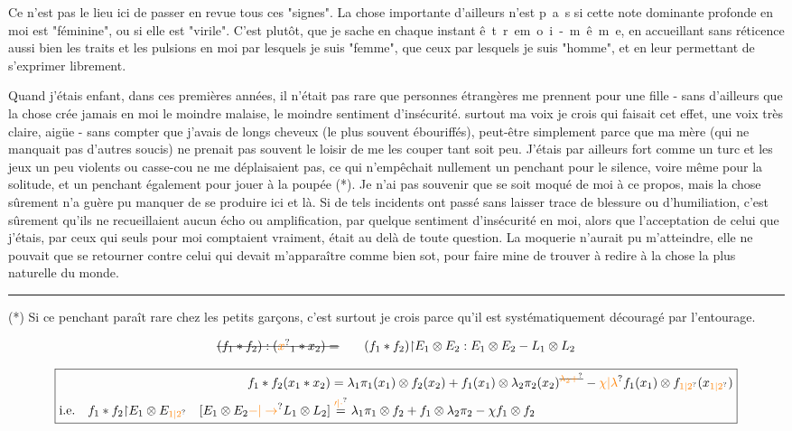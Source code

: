 Ce n'est pas le lieu ici de passer en revue tous ces "signes". La chose importante d'ailleurs n'est \mbox{p a s} si cette note dominante profonde en moi est "féminine", ou si elle est "virile". C'est plutôt, que je sache en chaque instant \mbox{ê t r e}\quad\mbox{m o i - m ê m e}, en accueillant sans réticence aussi bien les traits et les pulsions en moi par lesquels je\unsure{:} suis "femme", que ceux par lesquels je suis "homme", et en leur permettant de s'exprimer librement.

Quand j'étais enfant, dans ces premières années, il n'était pas rare que  personnes étrangères me prennent pour une fille - sans d'ailleurs que la chose crée jamais en moi le moindre malaise, le moindre sentiment d'insécurité.  surtout ma voix je crois qui faisait cet effet, une voix très claire, aigüe - sans compter que j'avais de longs cheveux (le plus souvent ébouriffés), peut-être simplement parce que ma mère (qui ne manquait pas d'autres soucis) ne prenait pas souvent le loisir de me les couper tant soit peu. J'étais par ailleurs fort comme un turc et les jeux un peu violents ou casse-cou ne me déplaisaient pas, ce qui n'empêchait nullement un penchant pour le silence, voire même pour la solitude, et un penchant également pour jouer à la poupée (*). Je n'ai pas souvenir que  se soit moqué de moi à ce propos, mais la chose sûrement n'a guère pu manquer de se produire ici et là. Si de tels incidents ont passé sans laisser trace de blessure ou d'humiliation, c'est sûrement qu'ils ne recueillaient aucun écho ou amplification, par quelque sentiment d'insécurité en moi, alors que l'acceptation de celui que j'étais, par ceux qui seuls pour moi comptaient vraiment, était au delà de toute question. La moquerie n'aurait pu m'atteindre, elle ne pouvait que se retourner contre celui qui devait m'apparaître comme bien sot, pour faire mine de trouver à redire à la chose la plus naturelle du monde.

\noindent\rule{5em}{0.4pt}\par
(*) Si ce penchant paraît rare chez les petits garçons, c'est surtout je crois parce qu'il est systématiquement découragé par l'entourage.


\[
\deleted{(f_1\ast f_2):(\unsure{x}_1\ast x_2)=}
\qquad (f_1\ast f_2)\mathord{\upharpoonright} E_1\otimes E_2:
 E_1\otimes E_2 - L_1\otimes L_2
\]

\[
\boxed{\begin{aligned}
 f_1\ast f_2(x_1\ast x_2)&=\lambda_1\pi_1(x_1)\otimes f_2(x_2)
 + f_1(x_1)\otimes\lambda_2\pi_2(x_2)^{\deleted{\unsure{\lambda_2+}}}
 -\unsure{\chi|\lambda}f_1(x_1)\otimes f_{\unsure{1|2}}(x_{\unsure{1|2}})\\
 \text{i.e.}\quad f_1\ast f_2\mathord{\upharpoonright} E_1\otimes E_{\unsure{1|2}}\quad
 [E_1\otimes E_2\unsure{-|\to} L_1\otimes L_2]&\overset{\unsure{\prime|\cdot}}{=}\lambda_1\pi_1\otimes f_2+
 f_1\otimes\lambda_2\pi_2-\chi f_1\otimes f_2
\end{aligned}}
\]


